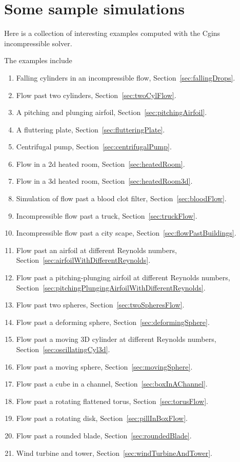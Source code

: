 \section{Some sample simulations} \label{sec:sampleSimulations}

Here is a collection of interesting examples computed with the Cgins incompressible solver.

The examples include
\begin{enumerate}
   \item Falling cylinders in an incompressible flow, Section~\ref{sec:fallingDrops}.
   \item Flow past two cylinders, Section~\ref{sec:twoCylFlow}.
  \item A pitching and plunging airfoil, Section~\ref{sec:pitchingAirfoil}.
  \item A fluttering plate, Section~\ref{sec:flutteringPlate}.
  \item Centrifugal pump, Section~\ref{sec:centrifugalPump}.
  \item Flow in a 2d heated room, Section~\ref{sec:heatedRoom}.
  \item Flow in a 3d heated room, Section~\ref{sec:heatedRoom3d}.
  \item Simulation of flow past a blood clot filter, Section~\ref{sec:bloodFlow}.
  \item Incompressible flow past a truck, Section~\ref{sec:truckFlow}.
  \item Incompressible flow past a city scape, Section~\ref{sec:flowPastBuildings}.
  \item Flow past an airfoil at different Reynolds numbers, Section~\ref{sec:airfoilWithDifferentReynolds}.
  \item Flow past a pitching-plunging airfoil at different Reynolds numbers, 
         Section~\ref{sec:pitchingPlungingAirfoilWithDifferentReynolds}.
  \item Flow past two spheres, Section~\ref{sec:twoSpheresFlow}.
  \item Flow past a deforming sphere, Section~\ref{sec:deformingSphere}.
  \item Flow past a moving 3D cylinder at different Reynolds numbers, Section~\ref{sec:oscillatingCyl3d}.
  \item Flow past a moving sphere,  Section~\ref{sec:movingSphere}.
  \item Flow past a cube in a channel,  Section~\ref{sec:boxInAChannel}.
  \item Flow past a rotating flattened torus,  Section~\ref{sec:torusFlow}.
  \item Flow past a rotating disk,  Section~\ref{sec:pillInBoxFlow}.
  \item Flow past a rounded blade,  Section~\ref{sec:roundedBlade}.
  \item Wind turbine and tower,  Section~\ref{sec:windTurbineAndTower}.
\end{enumerate}


